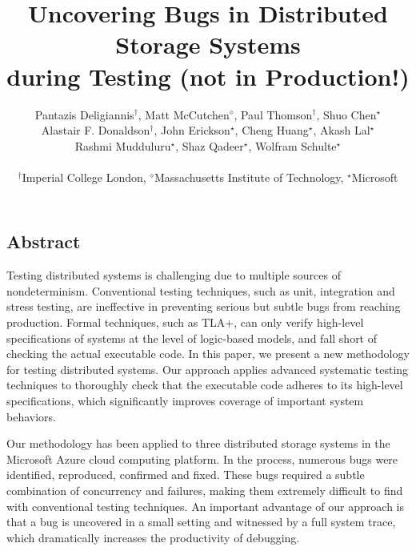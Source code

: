 \documentclass[letterpaper,twocolumn,10pt]{article}
\newcommand{\Azure}{Azure\xspace}
\newcommand{\Microsoft}{Microsoft\xspace}
\begin{document}
\date{}

\title{\Large \bf Uncovering Bugs in Distributed Storage Systems\\during Testing (not in Production!)}

\author{
{\rm Pantazis Deligiannis$^\dagger$, Matt McCutchen$^\diamond$, Paul Thomson$^\dagger$, Shuo Chen$^\star$}\\
{\rm Alastair F. Donaldson$^\dagger$, John Erickson$^\star$, Cheng Huang$^\star$, Akash Lal$^\star$}\\
{\rm Rashmi Mudduluru$^\star$, Shaz Qadeer$^\star$, Wolfram Schulte$^\star$}\\\\
$^\dagger$Imperial College London, $^\diamond$Massachusetts Institute of Technology, $^\star$Microsoft\\
} %

\maketitle

\thispagestyle{empty}

\subsection*{Abstract}
Testing distributed systems is challenging due to multiple sources of nondeterminism. Conventional testing techniques, such as unit, integration and stress testing, are ineffective in preventing serious but subtle bugs from reaching production. Formal techniques, such as TLA+, can only verify high-level specifications of systems at the level of logic-based models, and fall short of checking the actual executable code. In this paper, we present a new methodology for testing distributed systems. Our approach applies advanced systematic testing techniques to thoroughly check that the executable code adheres to its high-level specifications, which significantly improves coverage of important system behaviors.

Our methodology has been applied to three distributed storage systems in the \Microsoft \Azure cloud computing platform. In the process, numerous bugs were identified, reproduced, confirmed and fixed. These bugs required a subtle combination of concurrency and failures, making them extremely difficult to find with conventional testing techniques. An important advantage of our approach is that a bug is uncovered in a small setting and witnessed by a full system trace, which dramatically increases the productivity of debugging.
\end{document}
